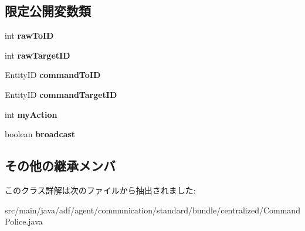 \subsection*{限定公開変数類}
\begin{DoxyCompactItemize}
\item 
\hypertarget{classadf_1_1agent_1_1communication_1_1standard_1_1bundle_1_1centralized_1_1CommandPolice_ae8c679d636a28ae546a9f4181ddf6100}{}\label{classadf_1_1agent_1_1communication_1_1standard_1_1bundle_1_1centralized_1_1CommandPolice_ae8c679d636a28ae546a9f4181ddf6100} 
int {\bfseries raw\+To\+ID}
\item 
\hypertarget{classadf_1_1agent_1_1communication_1_1standard_1_1bundle_1_1centralized_1_1CommandPolice_aae55db1875805499e98740b6d38d5ed3}{}\label{classadf_1_1agent_1_1communication_1_1standard_1_1bundle_1_1centralized_1_1CommandPolice_aae55db1875805499e98740b6d38d5ed3} 
int {\bfseries raw\+Target\+ID}
\item 
\hypertarget{classadf_1_1agent_1_1communication_1_1standard_1_1bundle_1_1centralized_1_1CommandPolice_a0c1b7caf001436ad3ba26c4913c63a46}{}\label{classadf_1_1agent_1_1communication_1_1standard_1_1bundle_1_1centralized_1_1CommandPolice_a0c1b7caf001436ad3ba26c4913c63a46} 
Entity\+ID {\bfseries command\+To\+ID}
\item 
\hypertarget{classadf_1_1agent_1_1communication_1_1standard_1_1bundle_1_1centralized_1_1CommandPolice_ae0925f1844cdb9a019c309b3972fa399}{}\label{classadf_1_1agent_1_1communication_1_1standard_1_1bundle_1_1centralized_1_1CommandPolice_ae0925f1844cdb9a019c309b3972fa399} 
Entity\+ID {\bfseries command\+Target\+ID}
\item 
\hypertarget{classadf_1_1agent_1_1communication_1_1standard_1_1bundle_1_1centralized_1_1CommandPolice_ac4959c130aef15079efd18fc62d03bba}{}\label{classadf_1_1agent_1_1communication_1_1standard_1_1bundle_1_1centralized_1_1CommandPolice_ac4959c130aef15079efd18fc62d03bba} 
int {\bfseries my\+Action}
\item 
\hypertarget{classadf_1_1agent_1_1communication_1_1standard_1_1bundle_1_1centralized_1_1CommandPolice_a5c5bec5e7a73480cefa5cb83524db8ff}{}\label{classadf_1_1agent_1_1communication_1_1standard_1_1bundle_1_1centralized_1_1CommandPolice_a5c5bec5e7a73480cefa5cb83524db8ff} 
boolean {\bfseries broadcast}
\end{DoxyCompactItemize}
\subsection*{その他の継承メンバ}


このクラス詳解は次のファイルから抽出されました\+:\begin{DoxyCompactItemize}
\item 
src/main/java/adf/agent/communication/standard/bundle/centralized/Command\+Police.\+java\end{DoxyCompactItemize}
